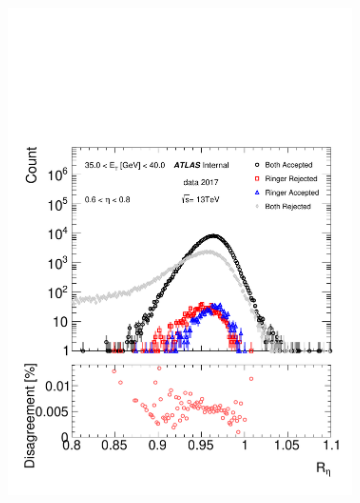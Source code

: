 \begin{figure}[h!]
\centering
\begin{subfigure}[c]{.49\textwidth}
\centering
\includegraphics[width=\textwidth]{sections/05_analysis/figures/quadrant_plots/reta.pdf}
\caption{}
\label{fig:quadrant_calo_variables_30GeV_eta}
\end{subfigure}
\begin{subfigure}[c]{.49\textwidth}
\centering

\end{subfigure}
\end{figure}
